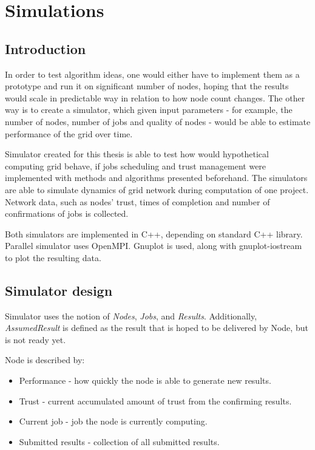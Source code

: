 \chapter{Simulations}
\label{ch:simulations}

\section{Introduction}

In order to test algorithm ideas, one would either have to implement them as a prototype and run it on significant number of nodes, hoping that the results would scale in predictable way in relation to how node count changes. The other way is to create a simulator, which given input parameters - for example, the number of nodes, number of jobs and quality of nodes - would be able to estimate performance of the grid over time.

Simulator created for this thesis is able to test how would hypothetical computing grid behave, if jobs scheduling and trust management were implemented with methods and algorithms presented beforehand. The simulators are able to simulate dynamics of grid network during computation of one project. Network data, such as nodes' trust, times of completion and number of confirmations of jobs is collected.

Both simulators are implemented in C++, depending on standard C++ library. Parallel simulator uses OpenMPI. Gnuplot is used, along with gnuplot-iostream~\cite{gp-iostream} to plot the resulting data.

\section{Simulator design}
\label{s:simdesign}

Simulator uses the notion of \emph{Nodes}, \emph{Jobs}, and \emph{Results}. Additionally, \emph{AssumedResult} is defined as the result that is hoped to be delivered by Node, but is not ready yet.

Node is described by:
\begin{itemize}
\item Performance - how quickly the node is able to generate new results.
\item Trust - current accumulated amount of trust from the confirming results.
\item Current job - job the node is currently computing.
\item Submitted results - collection of all submitted results.
\end{itemize}

